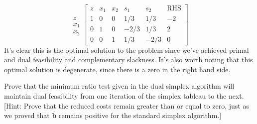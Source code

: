 \begin{example}
\begin{displaymath}
\begin{array}{c}
\\
z\\
x_1\\
x_2
\end{array}
\left[
\begin{array}{c|cccc|c}
z& x_1 & x_2 & s_1 & s_2 &\text{RHS}\\
\hline
1 & 0 & 0 & 1/3 & 1/3 & -2\\
\hline
0 & 1		& 0 	& -2/3 	& 1/3 	& 2\\
0 & 0 		& 1 	& 1/3 	& -2/3 	& 0
\end{array}\right]
\end{displaymath}
It's clear this is the optimal solution to the problem since we've achieved primal and dual feasibility and complementary slackness. It's also worth noting that this optimal solution is degenerate, since there is a zero in the right hand side. 
\end{example}

\begin{exercise} Prove that the minimum ratio test given in the dual simplex algorithm will maintain dual feasibility from one iteration of the simplex tableau to the next. [Hint: Prove that the reduced costs remain greater than or equal to zero, just as we proved that $\overline{\mathbf{b}}$ remains positive for the standard simplex algorithm.]
\end{exercise}